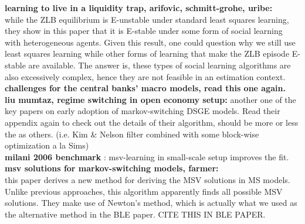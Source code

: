 \documentclass[12pt,reqno]{article}
\numberwithin{equation}{section}
\begin{document}
\textbf{learning to live in a liquidity trap, arifovic, schmitt-grohe, uribe: } \\

while the ZLB equilibrium is E-unstable under standard least squares learning, they show in this paper that it is E-stable under some form of social learning with heterogeneous agents. Given this result, one could question why we still use least squares learning while other forms of learning that make the ZLB episode E-stable are available. The answer is, these types of social learning algorithms are also excessively complex, hence they are not feasible in an estimation context. \\

\textbf{challenges for the central banks' macro models, read this one again. }\\

\textbf{liu mumtaz, regime switching in open economy setup: } another one of the key papers on early adoption of markov-switching DSGE models. Read their appendix again to check out the details of their algorithm, should be more or less the as others. (i.e. Kim \& Nelson filter combined with some block-wise optimization a la Sims) \\

\textbf{ milani 2006 benchmark} : msv-learning in small-scale setup improves the fit. \\


\textbf{msv solutions for markov-switching models, farmer: } \\

this paper derives a new method for deriving the MSV solutions in MS models. Unlike previous approaches, this algorithm apparently finds all possible MSV solutions. They make use of Newton's method, which is actually what we used as the alternative method in the BLE paper. CITE THIS IN BLE PAPER. 
\end{document}
